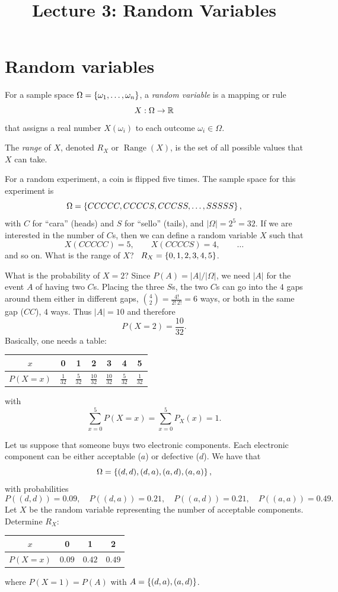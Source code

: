 
\title{Lecture 3: Random Variables}
\author{}\date{}


\maketitle

\section{Random variables}
For a sample space $\Omega = \left\{\omega_1, \dots, \omega_n\right\}$, a \emph{random variable} is a mapping or rule
\[
X : \Omega \to \mathbb{R}
\]
that assigns a real number $X(\omega_i)$ to each outcome $\omega_i \in \Omega$.

The \emph{range} of $X$, denoted $R_X$ or $\operatorname{Range}(X)$, is the set of all possible values that $X$ can take.

\begin{example}
For a random experiment, a coin is flipped five times. The sample space for this experiment is
\[
\Omega = \left\{CCCCC, CCCCS, CCCSS, \dots, SSSSS\right\},
\]
with $C$ for ``cara'' (heads) and $S$ for ``sello'' (tails), and $|\Omega| = 2^5 = 32$.
If we are interested in the number of $C$s, then we can define a random variable $X$ such that
\[
X(CCCCC) = 5, \qquad X(CCCCS) = 4, \qquad \dots
\]
and so on. What is the range of $X$? \ $R_X = \left\{0,1,2,3,4,5\right\}$.

What is the probability of $X = 2$? Since $P(A) = |A|/|\Omega|$, we need $|A|$ for the event $A$ of having two $C$s. Placing the three $S$s, the two $C$s can go into the $4$ gaps around them either in different gaps, $\binom{4}{2} = \frac{4!}{2!\,2!} = 6$ ways, or both in the same gap ($CC$), $4$ ways. Thus $|A| = 10$ and therefore
\[
P(X = 2) = \frac{10}{32}.
\]
Basically, one needs a table:
\begin{center}
\begin{tabular}{c|cccccc}
$x$ & 0 & 1 & 2 & 3 & 4 & 5\\ \hline
$P(X=x)$ & $\frac{1}{32}$ & $\frac{5}{32}$ & $\frac{10}{32}$ & $\frac{10}{32}$ & $\frac{5}{32}$ & $\frac{1}{32}$
\end{tabular}
\end{center}
with
\[
\sum_{x=0}^{5} P(X = x) = \sum_{x=0}^{5} P_X(x) = 1.
\]
\end{example}

\begin{example}
Let us suppose that someone buys two electronic components. Each electronic component can be either acceptable ($a$) or defective ($d$). We have that
\[
\Omega = \left\{(d,d), (d,a), (a,d), (a,a)\right\},
\]
with probabilities
\[
P((d,d)) = 0.09, \quad P((d,a)) = 0.21, \quad P((a,d)) = 0.21, \quad P((a,a)) = 0.49.
\]
Let $X$ be the random variable representing the number of acceptable components. Determine $R_X$:
\begin{center}
\begin{tabular}{c|ccc}
$x$ & 0 & 1 & 2\\ \hline
$P(X=x)$ & $0.09$ & $0.42$ & $0.49$
\end{tabular}
\end{center}
where $P(X=1) = P(A)$ with $A = \left\{(d,a), (a,d)\right\}$.
\end{example}

